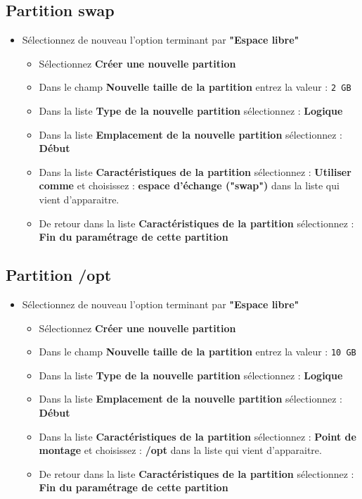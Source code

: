 \subsection{Partition swap}
	\begin{itemize}
		\item Sélectionnez de nouveau l'option terminant par \textbf{"Espace libre"}
		\begin{itemize}
			\item Sélectionnez \textbf{Créer une nouvelle partition}
			\item Dans le champ \textbf{Nouvelle taille de la partition} entrez la valeur : \texttt{2 GB}
			\item Dans la liste \textbf{Type de la nouvelle partition} sélectionnez : \textbf{Logique}
			\item Dans la liste \textbf{Emplacement de la nouvelle partition} sélectionnez : \textbf{Début}
			\item Dans la liste \textbf{Caractéristiques de la partition} sélectionnez : \textbf{Utiliser comme} et choisissez : \textbf{espace d'échange ("swap")} dans la liste qui vient d'apparaitre.
			\item De retour dans la liste \textbf{Caractéristiques de la partition} sélectionnez : \textbf{Fin du paramétrage de cette partition}
		\end{itemize}	
	\end{itemize}
	
\subsection{Partition /opt}
\begin{itemize}
	\item Sélectionnez de nouveau l'option terminant par \textbf{"Espace libre"}
	\begin{itemize}
		\item Sélectionnez \textbf{Créer une nouvelle partition}
		\item Dans le champ \textbf{Nouvelle taille de la partition} entrez la valeur : \texttt{10 GB}
		\item Dans la liste \textbf{Type de la nouvelle partition} sélectionnez : \textbf{Logique}
		\item Dans la liste \textbf{Emplacement de la nouvelle partition} sélectionnez : \textbf{Début}
		\item Dans la liste \textbf{Caractéristiques de la partition} sélectionnez : \textbf{Point de montage} et choisissez : \textbf{/opt} dans la liste qui vient d'apparaitre.
		\item De retour dans la liste \textbf{Caractéristiques de la partition} sélectionnez : \textbf{Fin du paramétrage de cette partition}
	\end{itemize}	
\end{itemize}

